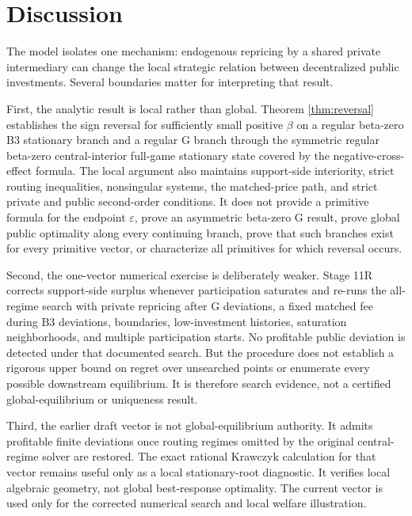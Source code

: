 \section{Discussion}\label{sec:discussion}

The model isolates one mechanism: endogenous repricing by a shared private intermediary can change the local strategic relation between decentralized public investments. Several boundaries matter for interpreting that result.

First, the analytic result is local rather than global. Theorem \ref{thm:reversal} establishes the sign reversal for sufficiently small positive $\beta$ on a regular beta-zero B3 stationary branch and a regular G branch through the symmetric regular beta-zero central-interior full-game stationary state covered by the negative-cross-effect formula. The local argument also maintains support-side interiority, strict routing inequalities, nonsingular systems, the matched-price path, and strict private and public second-order conditions. It does not provide a primitive formula for the endpoint $\varepsilon$, prove an asymmetric beta-zero G result, prove global public optimality along every continuing branch, prove that such branches exist for every primitive vector, or characterize all primitives for which reversal occurs.

Second, the one-vector numerical exercise is deliberately weaker. Stage 11R corrects support-side surplus whenever participation saturates and re-runs the all-regime search with private repricing after G deviations, a fixed matched fee during B3 deviations, boundaries, low-investment histories, saturation neighborhoods, and multiple participation starts. No profitable public deviation is detected under that documented search. But the procedure does not establish a rigorous upper bound on regret over unsearched points or enumerate every possible downstream equilibrium. It is therefore search evidence, not a certified global-equilibrium or uniqueness result.

Third, the earlier draft vector is not global-equilibrium authority. It admits profitable finite deviations once routing regimes omitted by the original central-regime solver are restored. The exact rational Krawczyk calculation for that vector remains useful only as a local stationary-root diagnostic. It verifies local algebraic geometry, not global best-response optimality. The current vector is used only for the corrected numerical search and local welfare illustration.

